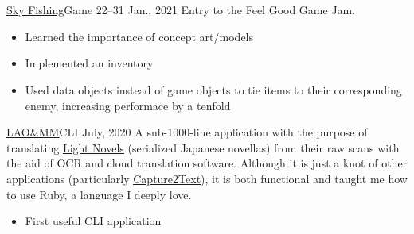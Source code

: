 \documentclass[10pt,a4paper,ragged2e,withhyper]{altacv}
\begin{document}
\begin{paracol}{2}
		
		
		\newpage
		
		\switchcolumn
		
		 \\ %
		\cvtag{\LaTeX}
		
		 \\ %
		
		
		\cvevent
		{\href{https://jimmys-test-site.itch.io/skyfishing}{\uline{Sky Fishing}}{\hr}Game}
		{}
		{22--31 Jan., 2021}{}
		Entry to the Feel Good Game Jam.
		\smallskip
		\begin{itemize}
			\item Learned the importance of concept art/models
			\item Implemented an inventory
			\item Used data objects instead of game objects to tie items to their corresponding enemy, increasing performace by a tenfold
		\end{itemize}
		
		\divider
		
		\cvevent
		{\href{https://github.com/jaacko-torus/lao-mm/}{\uline{LAO\&MM}}{\hr}CLI}
		{}
		{July, 2020}{}
		A sub-1000-line application with the purpose of translating \href{https://en.wikipedia.org/wiki/Light_novel}{\uline{Light Novels}} (serialized Japanese novellas) from their raw scans with the aid of OCR and cloud translation software. Although it is just a knot of other applications (particularly \href{http://capture2text.sourceforge.net}{\uline{Capture2Text}}), it is both functional and taught me how to use Ruby, a language I deeply love.
		\smallskip
		\begin{itemize}
			\item First useful CLI application
		\end{itemize}
		

\end{paracol}
\end{document}
